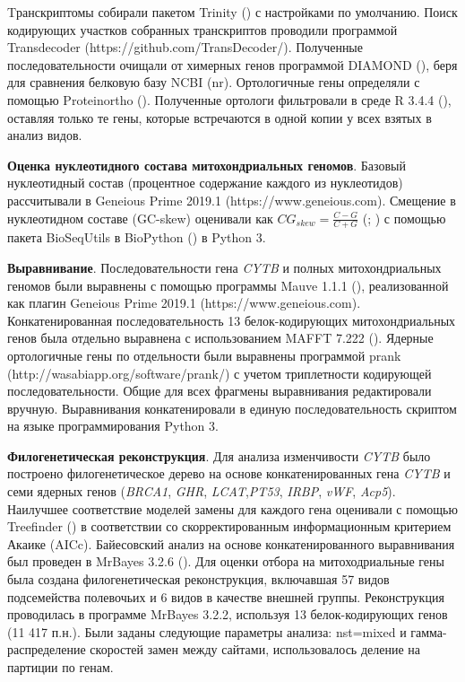 Tранскриптомы собирали пакетом Trinity (\cite{Grabherr2011}) с настройками по умолчанию. Поиск кодирующих участков собранных транскриптов проводили программой Transdecoder (https://github.com/TransDecoder/). Полученные последовательности очищали от химерных генов программой DIAMOND (\cite{Buchfink2015}), беря для сравнения белковую базу NCBI (nr). Ортологичные гены определяли с помощью Proteinortho (\cite{Lechner2011}). Полученные ортологи фильтровали в среде R 3.4.4 (\cite{RCoreTeam2017}), оставляя только те гены, которые встречаются в одной копии у всех взятых в анализ видов. 

\textbf{Оценка нуклеотидного состава митохондриальных геномов}. Базовый нуклеотидный состав (процентное содержание каждого из нуклеотидов) рассчитывали в Geneious Prime 2019.1 (https://www.geneious.com). Смещение в нуклеотидном составе (GC-skew) оценивали как $CG_{skew} = \frac{C - G}{C + G}$ (\cite{Arabi2010}; \cite{Hassanin2005}) с помощью пакета BioSeqUtils в BioPython (\cite{Cock2009}) в Python 3. 

\textbf{Выравнивание}. Последовательности гена \textit{CYTB} и полных митохондриальных геномов были выравнены с помощью программы Mauve 1.1.1 (\cite{Darling2004}), реализованной как плагин Geneious Prime 2019.1 (https://www.geneious.com). Конкатенированная последовательность 13 белок-кодирующих митохондриальных генов была отдельно выравнена с использованием MAFFT 7.222 (\cite{Katoh2014}). Ядерные ортологичные гены по отдельности были выравнены программой prank (http://wasabiapp.org/software/prank/) с учетом триплетности кодирующей последовательности. Общие для всех фрагмены выравнивания редактировали вручную. Выравнивания конкатенировали в единую последовательность скриптом на языке программирования Python 3.

\textbf{Филогенетическая реконструкция}. Для анализа изменчивости \textit{CYTB} было построено филогенетическое дерево на основе конкатенированных гена \textit{CYTB} и семи ядерных генов (\textit{BRCA1}, \textit{GHR}, \textit{LCAT},\textit{PT53}, \textit{IRBP}, \textit{vWF}, \textit{Acp5}). Наилучшее соответствие моделей замены для каждого гена оценивали с помощью Treefinder (\cite{Jobb2004}) в соответствии со скорректированным информационным критерием Акаике (AICc). Байесовский анализ на основе конкатенированного выравнивания был проведен в MrBayes 3.2.6 (\cite{Ronquist2012}). Для оценки отбора на митоходриальные гены была создана филогенетическая реконструкция, включавшая 57 видов подсемейства полевочьих и 6 видов в качестве внешней группы. Реконструкция проводилась в программе MrBayes 3.2.2, используя 13 белок-кодирующих генов (11 417 п.н.). Были заданы следующие параметры анализа: nst=mixed и гамма-распределение скоростей замен между сайтами, использовалось деление на партиции по генам. 

